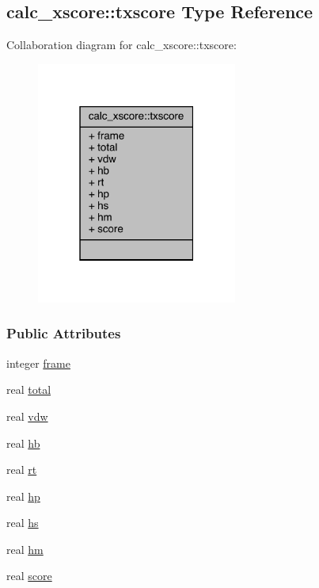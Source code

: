 \hypertarget{structcalc__xscore_1_1txscore}{\subsection{calc\-\_\-xscore\-:\-:txscore Type Reference}
\label{structcalc__xscore_1_1txscore}
}


Collaboration diagram for calc\-\_\-xscore\-:\-:txscore\-:
\nopagebreak
\begin{figure}[H]
\begin{center}
\leavevmode
\includegraphics[width=187pt]{structcalc__xscore_1_1txscore__coll__graph}
\end{center}
\end{figure}
\subsubsection*{Public Attributes}
\begin{DoxyCompactItemize}
\item 
integer \hyperlink{structcalc__xscore_1_1txscore_abe00c92b236f3bfb296ca40be8b22980}{frame}
\item 
real \hyperlink{structcalc__xscore_1_1txscore_a0f4f12b1dc6ea5111980b6868c8ae478}{total}
\item 
real \hyperlink{structcalc__xscore_1_1txscore_ab23b87d55742270a8ca8536fea62650c}{vdw}
\item 
real \hyperlink{structcalc__xscore_1_1txscore_a3c70f31323075f2b0aea07d81ed49e1b}{hb}
\item 
real \hyperlink{structcalc__xscore_1_1txscore_a978e6a954a831240b0f994e2dde36e88}{rt}
\item 
real \hyperlink{structcalc__xscore_1_1txscore_a091b8e29435f6155c31e96b221bde85b}{hp}
\item 
real \hyperlink{structcalc__xscore_1_1txscore_ab0a213daea29b950f439076c68bc90ad}{hs}
\item 
real \hyperlink{structcalc__xscore_1_1txscore_a9c6f0f0449fac48b9a0a200c385afd3d}{hm}
\item 
real \hyperlink{structcalc__xscore_1_1txscore_ac34999e3896c896cb9e76ebf828e80ea}{score}
\end{DoxyCompactItemize}


